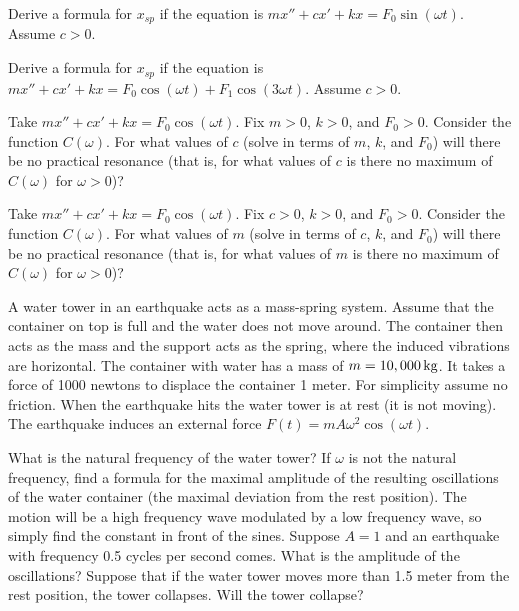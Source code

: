 \begin{exercise}
Derive a formula for $x_{sp}$ if the equation is
$m x'' + c x' + kx = F_0 \sin (\omega t)$.  Assume $c > 0$.
\end{exercise}

\begin{exercise}
Derive a formula for $x_{sp}$ if the equation is
$m x'' + c x' + kx = F_0 \cos (\omega t) + F_1 \cos (3\omega t)$.
Assume $c > 0$.
\end{exercise}

\begin{exercise}
Take $m x'' + c x' + kx = F_0 \cos (\omega t)$.
Fix $m > 0$, $k > 0$, and $F_0 > 0$.  Consider the function $C(\omega)$.
For what values of $c$ (solve in terms of $m$, $k$, and $F_0$) will there be no
practical resonance (that is, for what values of $c$ is there no maximum of
$C(\omega)$ for $\omega > 0$)?
\end{exercise}

\begin{exercise}
Take $m x'' + c x' + kx = F_0 \cos (\omega t)$.
Fix $c > 0$, $k > 0$, and $F_0 > 0$.  Consider the function $C(\omega)$.
For what values of $m$ (solve in terms of $c$, $k$, and $F_0$) will there be no
practical resonance (that is, for what values of $m$ is there no maximum of
$C(\omega)$ for $\omega > 0$)?
\end{exercise}

\begin{exercise}
\pagebreak[3]
A water tower in an earthquake acts as a mass-spring system.
Assume that the container on top is full and the water does not move around.
The container then acts as the mass and the support acts as the spring, where
the induced vibrations are horizontal.  The container with water
has a mass of $m=\unit[10,000]{kg}$.  It takes a force of 1000 newtons
to displace the container 1 meter.  For simplicity assume no friction.
When the earthquake hits the water tower is at rest (it is not moving).
%
The earthquake induces an external force 
$F(t) = m A \omega^2 \cos (\omega t)$.
\begin{tasks}
\task
What is the natural frequency of the water tower?
\task
If $\omega$ is not the natural frequency, find a formula for the maximal
amplitude of the resulting oscillations of the water container (the maximal
deviation from the rest position).  The motion will be a high frequency wave
modulated by a low frequency wave, so simply find the constant in front of the
sines.
\task
Suppose $A = 1$ and an earthquake with frequency 0.5 cycles per second
comes.  What is the amplitude of the oscillations?  Suppose that if the water
tower moves more than 1.5 meter from the rest position, the tower collapses.
Will the tower collapse?
\end{tasks}
\end{exercise}


